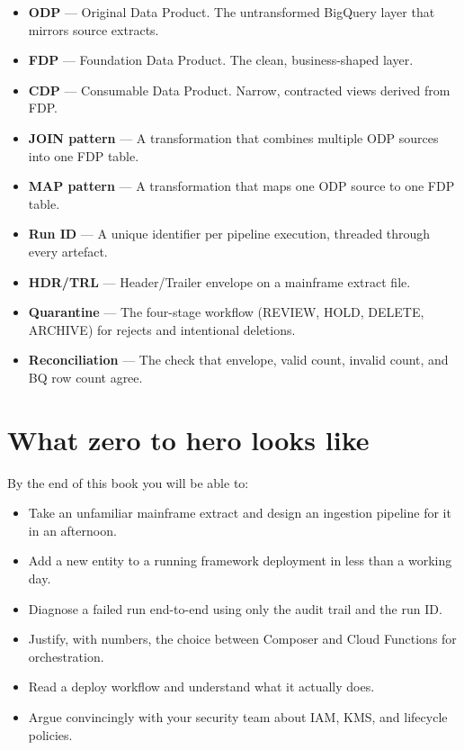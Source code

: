 \documentclass[
  11pt,
  british,
  oneside]{book}
\providecommand{\tightlist}{%
  \setlength{\itemsep}{0pt}\setlength{\parskip}{0pt}}
\begin{document}
\begin{itemize}
\tightlist
\item
  \textbf{ODP} --- Original Data Product. The untransformed
  BigQuery layer that mirrors source extracts.
\item
  \textbf{FDP} --- Foundation Data Product. The clean,
  business-shaped layer.
\item
  \textbf{CDP} --- Consumable Data Product. Narrow,
  contracted views derived from FDP.
\item
  \textbf{JOIN pattern} --- A transformation that
  combines multiple ODP sources into one FDP table.
\item
  \textbf{MAP pattern} --- A transformation that maps
  one ODP source to one FDP table.
\item
  \textbf{Run ID} --- A unique identifier per pipeline
  execution, threaded through every artefact.
\item
  \textbf{HDR/TRL}
  --- Header/Trailer envelope on a mainframe extract file.
\item
  \textbf{Quarantine} --- The four-stage workflow
  (REVIEW, HOLD, DELETE, ARCHIVE) for rejects and intentional deletions.
\item
  \textbf{Reconciliation} --- The check that
  envelope, valid count, invalid count, and BQ row count agree.
\end{itemize}

\hypertarget{what-zero-to-hero-looks-like}{%
\section{What zero to hero looks
like}\label{what-zero-to-hero-looks-like}}

By the end of this book you will be able to:

\begin{itemize}
\tightlist
\item
  Take an unfamiliar mainframe extract and design an ingestion pipeline
  for it in an afternoon.
\item
  Add a new entity to a running framework deployment in less than a
  working day.
\item
  Diagnose a failed run end-to-end using only the audit trail and the
  run ID.
\item
  Justify, with numbers, the choice between Composer and Cloud Functions
  for orchestration.
\item
  Read a deploy workflow and understand what it actually does.
\item
  Argue convincingly with your security team about IAM, KMS, and
  lifecycle policies.
\end{itemize}
\end{document}
